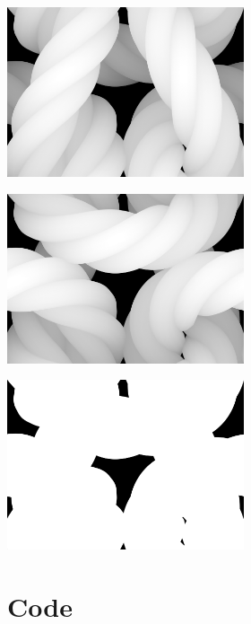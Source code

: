 \documentclass{article}
\begin{document}
\begin{center}
   \includegraphics[width=2.75in]{images/yarn-displacement-front.png}

   \includegraphics[width=2.75in]{images/yarn-displacement-back.png}

   \includegraphics[width=2.75in]{images/yarn-alpha.png}
\end{center}


\clearpage
\pagestyle{empty}

\section{Code}

\label{app:Code}
\end{document}
